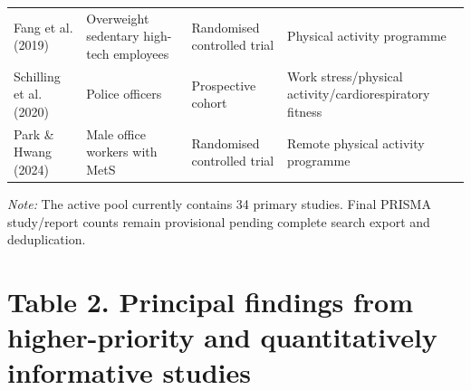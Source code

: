 \begin{longtable}{p{} p{} p{} p{}}
    Fang et al. (2019) & Overweight sedentary high-tech employees & Randomised controlled trial & Physical activity programme \\
    Schilling et al. (2020) & Police officers & Prospective cohort & Work stress/physical activity/cardiorespiratory fitness \\
    Park \& Hwang (2024) & Male office workers with MetS & Randomised controlled trial & Remote physical activity programme \\
\bottomrule
\end{longtable}

\noindent\textit{Note:} The active pool currently contains 34 primary studies. Final PRISMA study/report counts remain provisional pending complete search export and deduplication.

\section*{Table 2. Principal findings from higher-priority and quantitatively informative studies}

